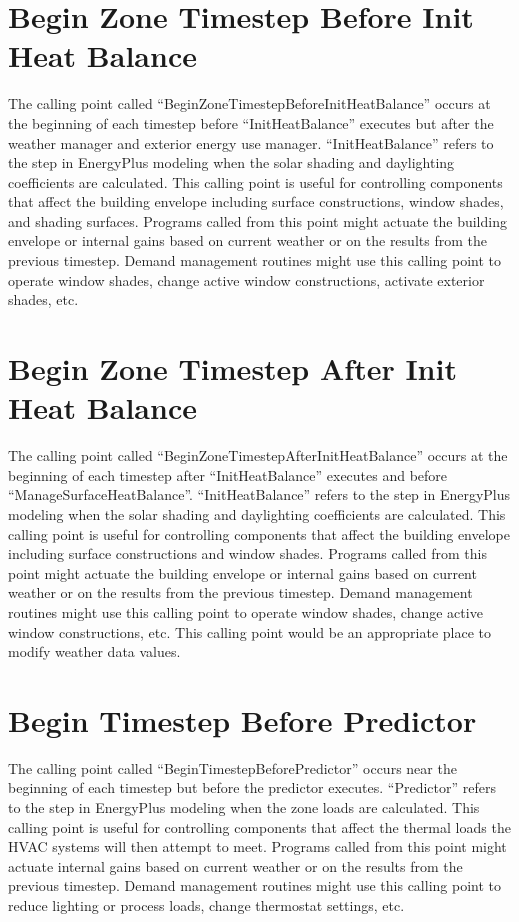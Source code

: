 \section{Begin Zone Timestep Before Init Heat Balance}\label{begin-timestep-before-init-heat-balance}

The calling point called ``BeginZoneTimestepBeforeInitHeatBalance'' occurs at the beginning of each timestep before ``InitHeatBalance'' executes but after the weather manager and exterior energy use manager. ``InitHeatBalance'' refers to the step in EnergyPlus modeling when the solar shading and daylighting coefficients are calculated. This calling point is useful for controlling components that affect the building envelope including surface constructions, window shades, and shading surfaces. Programs called from this point might actuate the building envelope or internal gains based on current weather or on the results from the previous timestep. Demand management routines might use this calling point to operate window shades, change active window constructions, activate exterior shades, etc.

\section{Begin Zone Timestep After Init Heat Balance}\label{begin-timestep-after-init-heat-balance}

The calling point called ``BeginZoneTimestepAfterInitHeatBalance'' occurs at the beginning of each timestep after ``InitHeatBalance'' executes and before ``ManageSurfaceHeatBalance''. ``InitHeatBalance'' refers to the step in EnergyPlus modeling when the solar shading and daylighting coefficients are calculated. This calling point is useful for controlling components that affect the building envelope including surface constructions and window shades. Programs called from this point might actuate the building envelope or internal gains based on current weather or on the results from the previous timestep. Demand management routines might use this calling point to operate window shades, change active window constructions, etc. This calling point would be an appropriate place to modify weather data values.

\section{Begin Timestep Before Predictor}\label{begin-timestep-before-predictor}

The calling point called ``BeginTimestepBeforePredictor'' occurs near the beginning of each timestep but before the predictor executes. ``Predictor'' refers to the step in EnergyPlus modeling when the zone loads are calculated. This calling point is useful for controlling components that affect the thermal loads the HVAC systems will then attempt to meet. Programs called from this point might actuate internal gains based on current weather or on the results from the previous timestep. Demand management routines might use this calling point to reduce lighting or process loads, change thermostat settings, etc.
